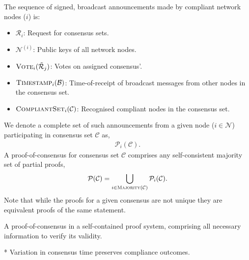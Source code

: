 \documentclass[twocolumn, aps, amsmath, amssymb, nofootinbib, superscriptaddress, longbibliography, floatfix, eqsecnum, rmp]{revtex4-2}
\begin{document}
The sequence of signed, broadcast announcements made by compliant network nodes ($i$) is:
\begin{itemize}
	\item $\mathcal{R}_i$: Request for consensus sets.
	\item $\mathcal{N}^{(i)}$: Public keys of all network nodes.
	\item $\textsc{Vote}_i(\tilde{\mathcal{R}}_j)$: Votes on assigned consensus'.
	\item $\textsc{Timestamp}_i(\mathcal{B})$: Time-of-receipt of broadcast messages from other nodes in the consensus set.
	\item $\textsc{CompliantSet}_i(\mathcal{C})$: Recognised compliant nodes in the consensus set.
\end{itemize}
We denote a complete set of such announcements from a given node ($i\in\mathcal{N}$) participating in consensus set $\mathcal{C}$ as,
\begin{align}
	\mathcal{P}_i(\mathcal{C}).
\end{align}
A proof-of-consensus for consensus set $\mathcal{C}$ comprises any self-consistent majority set of partial proofs,
\begin{align}
	\mathcal{P}(\mathcal{C}) = \bigcup_{i\in\textsc{Majority}(\mathcal{C})} \mathcal{P}_i(\mathcal{C}).
\end{align}
Note that while the proofs for a given consensus are not unique they are equivalent proofs of the same statement.

A proof-of-consensus in a self-contained proof system, comprising all necessary information to verify its validity.

* Variation in consensus time preserves compliance outcomes.
\end{document}

